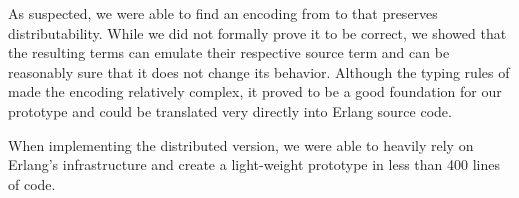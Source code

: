 As suspected, we were able to find an encoding
from \corejoincalc to \actorpicalc
that preserves distributability.
While we did not formally prove it to be correct,
we showed that the resulting terms can emulate their respective source term
and can be reasonably sure that it does not change its behavior.
Although the typing rules of \actorpicalc made the encoding relatively complex,
it proved to be a good foundation for our prototype
and could be translated very directly into Erlang source code.

When implementing the distributed version,
we were able to heavily rely on Erlang's infrastructure
and create a light-weight prototype in less than 400 lines of code.

